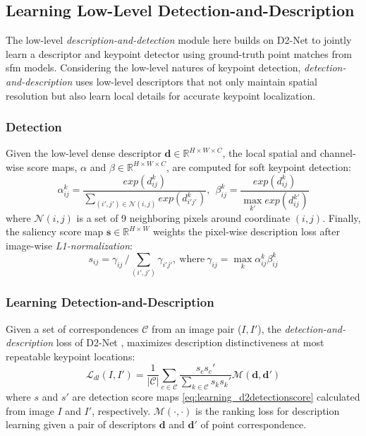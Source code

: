 \subsection{Learning Low-Level Detection-and-Description}
The low-level {\em description-and-detection} module here builds on D2-Net \cite{dusmanu2019d2} to jointly learn a descriptor and keypoint detector using ground-truth point matches from \acrshort{sfm} models.
Considering the low-level natures of keypoint detection, 
{\em detection-and-description} uses low-level descriptors that not only maintain spatial resolution but also learn local details for accurate keypoint localization.


\subsubsection{Detection}
Given the low-level dense descriptor $\mathbf{d} \in \mathbb{R}^{H \times W \times C}$, the local spatial and channel-wise score maps, $\alpha$ and $\beta \in \mathbb{R}^{H \times W \times C} $, are computed for soft keypoint detection:
\begin{equation} \label{eq:learning_d2localscore}
\alpha_{ij}^k = \frac{exp(d_{ij}^k)}{\sum_{(i',j')\in \mathcal{N}(i,j)}
exp(d_{i'j'}^k)}, \ \ 
\beta_{ij}^k = \frac{exp(d_{ij}^k)}{\max_{k'} exp(d_{ij}^{k'})}
\end{equation}
where $\mathcal{N}(i,j)$ is a set of 9 neighboring pixels around coordinate $(i,j)$. 
Finally, the saliency score map $\mathbf{s} \in \mathbb{R}^{H \times W}$ weights the pixel-wise description loss after image-wise \textit{L1-normalization}:
\begin{equation} \label{eq:learning_d2detectionscore}
s_{ij} = {\gamma_{ij}} \,\big/ {\sum_{(i',j')} \gamma_{i'j'}}, \ \textrm{where} \ \gamma_{ij} = \max_k \alpha_{ij}^k \beta_{ij}^k
\end{equation}

\subsubsection{Learning Detection-and-Description}
Given a set of correspondences $\mathcal{C}$ from an image pair ($I, I'$), the {\em detection-and-description} loss of D2-Net \cite{dusmanu2019d2}, maximizes description distinctiveness at
most repeatable keypoint locations:
\begin{equation} \label{eq:learning_d2loss}
\mathcal{L}_{dl}(I,I') = \frac{1}{|\mathcal{C}|} \sum_{c \in \mathcal{C}}\frac{s_c s_c'}{\sum_{k \in \mathcal{C}} s_k s_k'} \mathcal{M}(\mathbf{d}, \mathbf{d}')
\end{equation}
where $s$ and $s'$ are detection score maps \eqref{eq:learning_d2detectionscore} calculated from image $I$ and $I'$, respectively. 
$\mathcal{M}(\cdot, \cdot)$ is the ranking loss for description learning given a pair of descriptors $\mathbf{d}$ and $\mathbf{d}'$ of point correspondence. 

